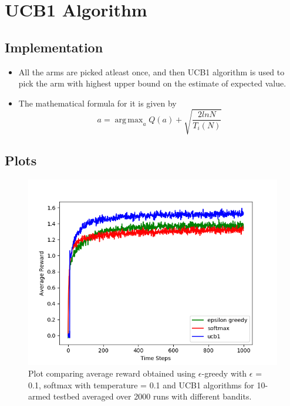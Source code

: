 \documentclass[english]{article}
\DeclareMathOperator*{\argmax}{arg\,max}
\begin{document}
\section{UCB1 Algorithm}
\subsection{Implementation}
\begin{itemize}
    \item All the arms are picked atleast once, and then UCB1 algorithm is used to pick the arm with highest upper bound on the estimate of expected value.
    \item The mathematical formula for it is given by $$ a = \argmax_{a} Q(a) + \sqrt{\dfrac{2lnN}{T_{i}(N)}} $$
\end{itemize}
\subsection{Plots}
\begin{figure}[H]
    \centering
    \includegraphics[width=\linewidth]{ucb1_avg_reward_10arms.png}
    \caption{Plot comparing average reward obtained using $\epsilon$-greedy with $\epsilon$ = 0.1, softmax with temperature = 0.1 and UCB1 algorithms for 10-armed testbed averaged over 2000 runs with different bandits.}
    \label{fig:eg1}
\end{figure}
\end{document}
